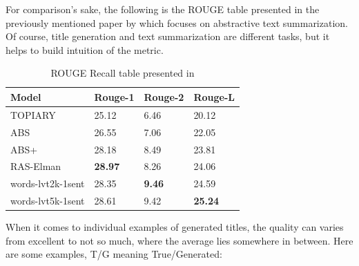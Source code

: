\documentclass{article}
\begin{document}
For comparison's sake, the following is the ROUGE table presented in the previously mentioned paper by \cite{abstractive-text} which focuses on abstractive text summarization. Of course, title generation and text summarization are different tasks, but it helps to build intuition of the metric.

\begin{table}[H]
    \centering
    \begin{tabular}{l|l|l|l}
        \toprule
        Model & Rouge-1 & Rouge-2 & Rouge-L \\
        \hline
        \midrule
        TOPIARY & 25.12 & 6.46 & 20.12\\
        ABS & 26.55 & 7.06 & 22.05\\
        ABS+ & 28.18 & 8.49 & 23.81\\
        RAS-Elman & \textbf{28.97} & 8.26 & 24.06\\
        words-lvt2k-1sent & 28.35 & \textbf{9.46} & 24.59\\
        words-lvt5k-1sent & 28.61 & 9.42 & \textbf{25.24}\\
        \bottomrule
    \end{tabular}
    \caption{ROUGE Recall table presented in \cite{abstractive-text}}
    \label{fig:word_len_stats}
\end{table}

When it comes to individual examples of generated titles, the quality can varies from excellent to not so much, where the average lies somewhere in between. Here are some examples, T/G meaning True/Generated:
\end{document}
